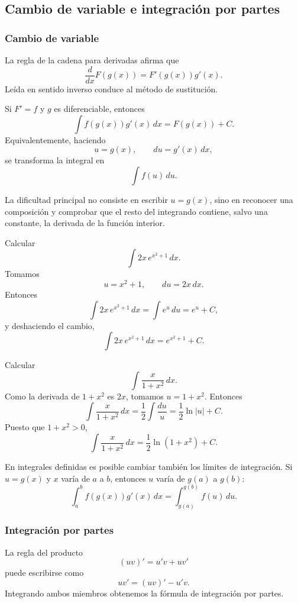 \subsection{Cambio de variable e integración por partes}

\subsubsection{Cambio de variable}

La regla de la cadena para derivadas afirma que
\[
\frac{d}{dx}F(g(x))=F'(g(x))g'(x).
\]
Leída en sentido inverso conduce al método de sustitución.

\begin{theorem}
Si $F'=f$ y $g$ es diferenciable, entonces
\[
\int f(g(x))g'(x)\,dx=F(g(x))+C.
\]
Equivalentemente, haciendo
\[
u=g(x),\qquad du=g'(x)\,dx,
\]
se transforma la integral en
\[
\int f(u)\,du.
\]
\end{theorem}

La dificultad principal no consiste en escribir $u=g(x)$, sino en reconocer una composición y comprobar que el resto del integrando contiene, salvo una constante, la derivada de la función interior.

\begin{example}
Calcular
\[
\int 2x\,e^{x^2+1}\,dx.
\]
Tomamos
\[
u=x^2+1,
\qquad du=2x\,dx.
\]
Entonces
\[
\int 2x\,e^{x^2+1}\,dx
=
\int e^u\,du
=e^u+C,
\]
y deshaciendo el cambio,
\[
\boxed{\int 2x\,e^{x^2+1}\,dx=e^{x^2+1}+C.}
\]
\end{example}

\begin{example}
Calcular
\[
\int \frac{x}{1+x^2}\,dx.
\]
Como la derivada de $1+x^2$ es $2x$, tomamos $u=1+x^2$. Entonces
\[
\int \frac{x}{1+x^2}\,dx
=
\frac12\int\frac{du}{u}
=
\frac12\ln|u|+C.
\]
Puesto que $1+x^2>0$,
\[
\boxed{\int \frac{x}{1+x^2}\,dx=\frac12\ln(1+x^2)+C.}
\]
\end{example}

En integrales definidas es posible cambiar también los límites de integración. Si $u=g(x)$ y $x$ varía de $a$ a $b$, entonces $u$ varía de $g(a)$ a $g(b)$:
\[
\int_a^b f(g(x))g'(x)\,dx
=
\int_{g(a)}^{g(b)}f(u)\,du.
\]

\subsubsection{Integración por partes}

La regla del producto
\[
(uv)'=u'v+uv'
\]
puede escribirse como
\[
u v'= (uv)'-u'v.
\]
Integrando ambos miembros obtenemos la fórmula de integración por partes.

